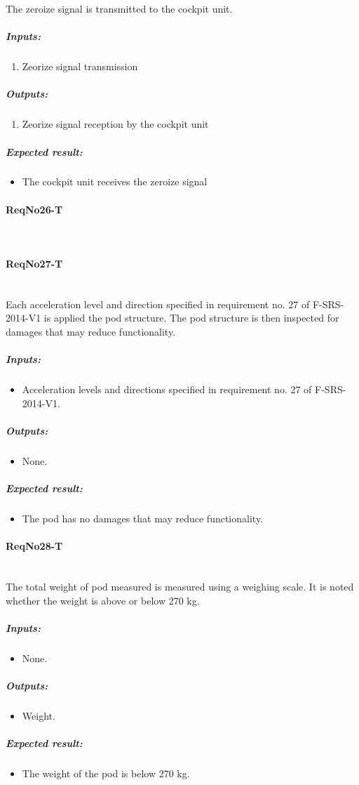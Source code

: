 The zeroize signal is transmitted to the cockpit unit. 
\subparagraph{Inputs:}
	\begin{enumerate}
	\item Zeorize signal transmission
	\end{enumerate}
\subparagraph{Outputs:}
	\begin{enumerate}
	\item Zeorize signal reception by the cockpit unit
	\end{enumerate}
\subparagraph{Expected result:}
	\begin{itemize}
	\item The cockpit unit receives the zeroize signal 
	\end{itemize}

\paragraph{ReqNo26-T}\mbox{}\\ %

\paragraph{ReqNo27-T}\mbox{}\\ %
 Each acceleration level and direction specified in requirement no. 27 of F-SRS-2014-V1 is applied the pod structure. The pod structure is then inspected for damages that may reduce functionality.

	\subparagraph{Inputs:}
	\begin{itemize}
	\item Acceleration levels and directions specified in requirement no. 27 of F-SRS-2014-V1.
	\end{itemize}
	\subparagraph{Outputs:}
	\begin{itemize}
	\item None.
	\end{itemize}
	\subparagraph{Expected result:}
	\begin{itemize}
	\item The pod has no damages that may reduce functionality.
	\end{itemize}


\paragraph{ReqNo28-T}\mbox{}\\ %
The total weight of pod measured is measured using a weighing scale. It is noted whether the weight is above or below 270 kg.
\\
	\subparagraph{Inputs:}
	\begin{itemize}
	\item None.
	\end{itemize}
	\subparagraph{Outputs:}
	\begin{itemize}
	\item Weight.
	\end{itemize}
	\subparagraph{Expected result:}
	\begin{itemize}
	\item The weight of the pod is below 270 kg.
	\end{itemize}

